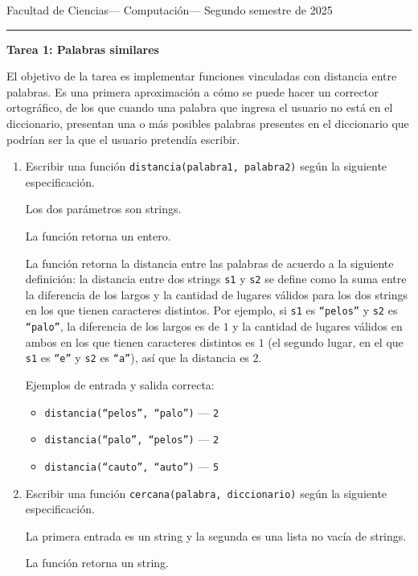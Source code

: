 \documentclass[a4paper,12pt]{book}
\theoremstyle{definition}
\begin{document}
	
	\noindent
	\centerline{\sc
		Facultad de Ciencias\hfill---\hfill
		Computación\hfill---\hfill
		Segundo semestre de 2025}\smallbreak\hrule
	
	\bigbreak
	\centerline{\Large\textbf{Tarea 1: Palabras similares}}
	\bigbreak
	
	El objetivo de la tarea es implementar funciones vinculadas con distancia entre palabras. Es una primera aproximación a cómo se puede hacer un corrector ortográfico, de los que cuando una palabra que ingresa el usuario no está en el diccionario, presentan una o más posibles palabras presentes en el diccionario que podrían ser la que el usuario pretendía escribir.
	
	\begin{enumerate}
		\item Escribir una función {\tt distancia(palabra1, palabra2)} según la siguiente especificación.
		
		Los dos parámetros son strings.
		
		La función retorna un entero.
		
		La función retorna la distancia entre las palabras de acuerdo a la siguiente definición: la distancia entre dos strings {\tt s1} y {\tt s2} se define como la suma entre la diferencia de los largos y la cantidad de lugares válidos para los dos strings en los que tienen caracteres distintos. Por ejemplo, si {\tt s1} es {\tt ``pelos''} y {\tt s2} es {\tt ``palo''}, la diferencia de los largos es de $1$ y la cantidad de lugares válidos en ambos en los que tienen caracteres distintos es $1$ (el segundo lugar, en el que {\tt s1} es {\tt ``e''} y {\tt s2} es {\tt ``a''}), así que la distancia es $2$.
		
		Ejemplos de entrada y salida correcta:
		\begin{itemize}\parskip-.5ex
			\item {\tt distancia(``pelos'', ``palo'')} --- {\tt 2}
			\item {\tt distancia(``palo'', ``pelos'')} --- {\tt 2}
			\item {\tt distancia(``cauto'', ``auto'')} --- {\tt 5}
		\end{itemize}
		
		\item Escribir una función {\tt cercana(palabra, diccionario)} según la siguiente especificación.
		
		La primera entrada es un string y la segunda es una lista no vacía de strings.
		
		La función retorna un string.
		

\end{enumerate}
\end{document}
